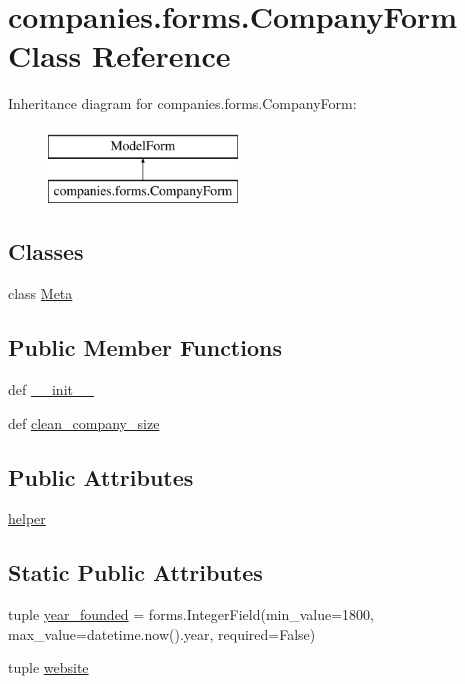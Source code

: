 \hypertarget{classcompanies_1_1forms_1_1_company_form}{\section{companies.\-forms.\-Company\-Form Class Reference}
\label{classcompanies_1_1forms_1_1_company_form}
}
Inheritance diagram for companies.\-forms.\-Company\-Form\-:\begin{figure}[H]
\begin{center}
\leavevmode
\includegraphics[height=2.000000cm]{classcompanies_1_1forms_1_1_company_form}
\end{center}
\end{figure}
\subsection*{Classes}
\begin{DoxyCompactItemize}
\item 
class \hyperlink{classcompanies_1_1forms_1_1_company_form_1_1_meta}{Meta}
\end{DoxyCompactItemize}
\subsection*{Public Member Functions}
\begin{DoxyCompactItemize}
\item 
def \hyperlink{classcompanies_1_1forms_1_1_company_form_aba52ef00f07ee163e409818c0c20fbe3}{\-\_\-\-\_\-init\-\_\-\-\_\-}
\item 
def \hyperlink{classcompanies_1_1forms_1_1_company_form_aebca9397566c23330dcd2d763740f364}{clean\-\_\-company\-\_\-size}
\end{DoxyCompactItemize}
\subsection*{Public Attributes}
\begin{DoxyCompactItemize}
\item 
\hyperlink{classcompanies_1_1forms_1_1_company_form_a03384adb1123519cffd3b8cafba44458}{helper}
\end{DoxyCompactItemize}
\subsection*{Static Public Attributes}
\begin{DoxyCompactItemize}
\item 
tuple \hyperlink{classcompanies_1_1forms_1_1_company_form_a28acc2dfce7e83ec0d85215a9d52fc5b}{year\-\_\-founded} = forms.\-Integer\-Field(min\-\_\-value=1800, max\-\_\-value=datetime.\-now().year, required=False)
\item 
tuple \hyperlink{classcompanies_1_1forms_1_1_company_form_a295f4e2a9def75781c3ac2212936b862}{website}
\end{DoxyCompactItemize}


